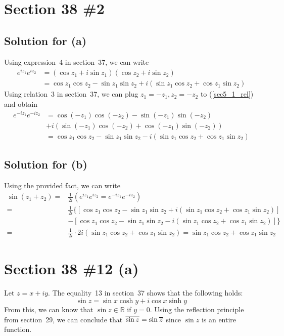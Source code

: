 \documentclass{scrartcl}
\newcommand\Overline[2][0.8pt]{%
  \begin{tikzpicture}[baseline=(a.base)]
    \node[inner xsep=0pt,inner ysep=1.5pt] (a) {$#2$};
    \draw[line width= #1] (a.north west) -- (a.north east);
  \end{tikzpicture}
}
\begin{document}
\section{Section 38 \#2}
\subsection{Solution for (a)}
Using expression~4 in section~37, we can write
\begin{align}
  \nonumber e^{iz_1} e^{iz_2} &= (\cos z_1 + i\sin z_1)(\cos z_2 + i\sin z_2) \\
  \label{sec5_1_rel}          &= \cos z_1 \cos z_2 - \sin z_1 \sin z_2 + i(\sin z_1 \cos z_2 + \cos z_1 \sin z_2)
\end{align}
Using relation~3 in section~37, we can plug \(z_1 = -z_1, z_2 = -z_2\) to (\ref{sec5_1_rel}) and obtain
\begin{align*}
  e^{-iz_1} e^{-iz_2} &= \cos(-z_1) \cos(-z_2) - \sin(-z_1) \sin(-z_2) \\
                      &+ i(\sin(-z_1) \cos(-z_2) + \cos(-z_1) \sin(-z_2)) \\
                      &= \cos z_1 \cos z_2 - \sin z_1 \sin z_2 - i(\sin z_1 \cos z_2 + \cos z_1 \sin z_2)
\end{align*}

\subsection{Solution for (b)}
Using the provided fact, we can write
\begin{align*}
  \sin(z_1 + z_2) =& \frac{1}{2i} \left( e^{iz_1} e^{iz_2} = e^{-iz_1} e^{-iz_2} \right) \\
                  =& \frac{1}{2i} \{[\cos z_1 \cos z_2 - \sin z_1 \sin z_2 + i(\sin z_1 \cos z_2 + \cos z_1 \sin z_2)] \\
                   &- [\cos z_1 \cos z_2 - \sin z_1 \sin z_2 - i(\sin z_1 \cos z_2 + \cos z_1 \sin z_2)]\} \\
                  =& \frac{1}{2i} \cdot 2i(\sin z_1 \cos z_2 + \cos z_1 \sin z_2) = \sin z_1 \cos z_2 + \cos z_1 \sin z_2
\end{align*}

\section{Section 38 \#12 (a)}
Let \(z = x + iy\).
The equality~13 in section~37 shows that the following holds:
\[
  \sin z = \sin x \cosh y + i \cos x \sinh y
\]
From this, we can know that \(\sin z \in \mathbb{R}\) if \(y = 0\).
Using the reflection principle from section~29, we can conclude that \(\Overline{\sin z} = \sin \Overline{z}\) since \(\sin z\) is an entire function.
\end{document}
